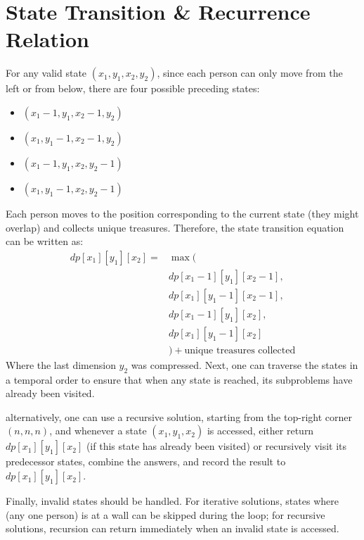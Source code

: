\documentclass[11pt, a4paper, oneside]{memoir}
\begin{document}
\section{State Transition \& Recurrence Relation}
For any valid state $(x_1, y_1, x_2, y_2)$, since each person can only move from the left or from below,
there are four possible preceding states:
\begin{itemize}
    \item $(x_1-1, y_1, x_2-1, y_2)$
    \item $(x_1, y_1-1, x_2-1, y_2)$
    \item $(x_1-1, y_1, x_2, y_2-1)$
    \item $(x_1, y_1-1, x_2, y_2-1)$
\end{itemize}
Each person moves to the position corresponding to the current state (they might overlap) and collects unique treasures.
Therefore, the state transition equation can be written as:
\begin{align*}
    dp[x_1][y_1][x_2] = & \max (                                \\
                        & dp[x_1-1][y_1][x_2-1],                \\
                        & dp[x_1][y_1-1][x_2-1],                \\
                        & dp[x_1-1][y_1][x_2],                  \\
                        & dp[x_1][y_1-1][x_2]                   \\
                        & ) + \text{unique treasures collected}
\end{align*}
Where the last dimension $y_2$ was compressed.
Next, one can traverse the states in a temporal order to ensure that when any state is reached, its subproblems have already been visited.

alternatively, one can use a recursive solution, starting from the top-right corner $(n,n,n)$,
and whenever a state $(x_1,y_1,x_2)$ is accessed, either return $dp[x_1][y_1][x_2]$ (if this state has already been visited) or recursively visit its predecessor states,
combine the answers, and record the result to $dp[x_1][y_1][x_2]$.

Finally, invalid states should be handled. For iterative solutions, states where (any one person) is at a wall can be skipped during the loop;
for recursive solutions, recursion can return immediately when an invalid state is accessed.
\end{document}

